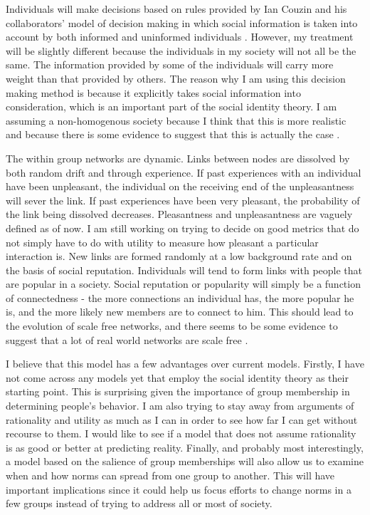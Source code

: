 \documentclass[rutwik_proposal.tex]{subfiles}
\begin{document}
Individuals will make decisions based on rules provided by Ian Couzin and his collaborators' model of decision making in which social information is taken into account by both informed and uninformed individuals \cite{Couzin11}. However, my treatment will be slightly different because the individuals in my society will not all be the same. The information provided by some of the individuals will carry more weight than that provided by others. The reason why I am using this decision making method is because it explicitly takes social information into consideration, which is an important part of the social identity theory. I am assuming a non-homogenous society because I think that this is more realistic and because there is some evidence to suggest that this is actually the case \cite{Koehler16}.

The within group networks are dynamic. Links between nodes are dissolved by both random drift and through experience. If past experiences with an individual have been unpleasant, the individual on the receiving end of the unpleasantness will sever the link. If past experiences have been very pleasant, the probability of the link being dissolved decreases. Pleasantness and unpleasantness are vaguely defined as of now. I am still working on trying to decide on good metrics that do not simply have to do with utility to measure how pleasant a particular interaction is. New links are formed randomly at a low background rate and on the basis of social reputation. Individuals will tend to form links with people that are popular in a society. Social reputation or popularity will simply be a function of connectedness - the more connections an individual has, the more popular he is, and the more likely new members are to connect to him. This should lead to the evolution of scale free networks, and there seems to be some evidence to suggest that a lot of real world networks are scale free \cite{Barabasi09}.

I believe that this model has a few advantages over current models. Firstly, I have not come across any models yet that employ the social identity theory as their starting point. This is surprising given the importance of group membership in determining people's behavior. I am also trying to stay away from arguments of rationality and utility as much as I can in order to see how far I can get without recourse to them. I would like to see if a model that does not assume rationality is as good or better at predicting reality. Finally, and probably most interestingly, a model based on the salience of group memberships will also allow us to examine when and how norms can spread from one group to another. This will have important implications since it could help us focus efforts to change norms in a few groups instead of trying to address all or most of society.
\end{document}
